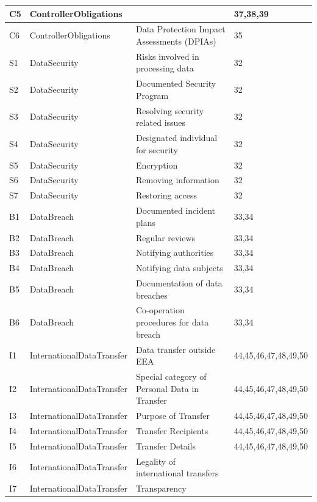 \begin{table}[htbp]
\begin{tabularx}{\textwidth}{|l|l|X|l|}
C5 & ControllerObligations &  & 37,38,39 \\ \hline
C6 & ControllerObligations & Data Protection Impact Assessments (DPIAs) & 35 \\ \hline
S1 & DataSecurity & Risks involved in processing data & 32 \\ \hline
S2 & DataSecurity & Documented Security Program & 32 \\ \hline
S3 & DataSecurity & Resolving security related issues & 32 \\ \hline
S4 & DataSecurity & Designated individual for security & 32 \\ \hline
S5 & DataSecurity & Encryption & 32 \\ \hline
S6 & DataSecurity & Removing information & 32 \\ \hline
S7 & DataSecurity & Restoring access & 32 \\ \hline
B1 & DataBreach & Documented incident plans & 33,34 \\ \hline
B2 & DataBreach & Regular reviews & 33,34 \\ \hline
B3 & DataBreach & Notifying authorities & 33,34 \\ \hline
B4 & DataBreach & Notifying data subjects & 33,34 \\ \hline
B5 & DataBreach & Documentation of data breaches & 33,34 \\ \hline
B6 & DataBreach & Co-operation procedures for data breach & 33,34 \\ \hline
I1 & InternationalDataTransfer & Data transfer outside EEA & 44,45,46,47,48,49,50 \\ \hline
I2 & InternationalDataTransfer & Special category of Personal Data in Transfer & 44,45,46,47,48,49,50 \\ \hline
I3 & InternationalDataTransfer & Purpose of Transfer & 44,45,46,47,48,49,50 \\ \hline
I4 & InternationalDataTransfer & Transfer Recipients & 44,45,46,47,48,49,50 \\ \hline
I5 & InternationalDataTransfer & Transfer Details & 44,45,46,47,48,49,50 \\ \hline
I6 & InternationalDataTransfer & Legality of international transfers &  \\ \hline
I7 & InternationalDataTransfer & Transparency &  \\ \hline

\end{tabularx}
\label{table:sparql:dpc-1}
\end{table}

